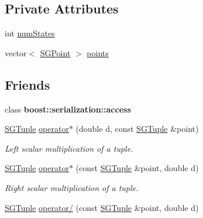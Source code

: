 \subsection*{Private Attributes}
\begin{DoxyCompactItemize}
\item 
int \hyperlink{class_s_g_tuple_a5c3c8e055cba010709ecc8914da1ea4f}{num\+States}
\item 
vector$<$ \hyperlink{class_s_g_point}{S\+G\+Point} $>$ \hyperlink{class_s_g_tuple_a2d9f4a67e7230c46d189eb4472417255}{points}
\end{DoxyCompactItemize}
\subsection*{Friends}
\begin{DoxyCompactItemize}
\item 
\hypertarget{class_s_g_tuple_ac98d07dd8f7b70e16ccb9a01abf56b9c}{class {\bfseries boost\+::serialization\+::access}}\label{class_s_g_tuple_ac98d07dd8f7b70e16ccb9a01abf56b9c}

\item 
\hypertarget{class_s_g_tuple_a774881a3412a621df63ed3454a2923a3}{\hyperlink{class_s_g_tuple}{S\+G\+Tuple} \hyperlink{class_s_g_tuple_a774881a3412a621df63ed3454a2923a3}{operator$\ast$} (double d, const \hyperlink{class_s_g_tuple}{S\+G\+Tuple} \&point)}\label{class_s_g_tuple_a774881a3412a621df63ed3454a2923a3}

\begin{DoxyCompactList}\small\item\em Left scalar multiplication of a tuple. \end{DoxyCompactList}\item 
\hypertarget{class_s_g_tuple_ab4926e79ee6cfcb52928edfee5f7aea6}{\hyperlink{class_s_g_tuple}{S\+G\+Tuple} \hyperlink{class_s_g_tuple_ab4926e79ee6cfcb52928edfee5f7aea6}{operator$\ast$} (const \hyperlink{class_s_g_tuple}{S\+G\+Tuple} \&point, double d)}\label{class_s_g_tuple_ab4926e79ee6cfcb52928edfee5f7aea6}

\begin{DoxyCompactList}\small\item\em Right scalar multiplication of a tuple. \end{DoxyCompactList}\item 
\hypertarget{class_s_g_tuple_a7862330b9a1f30c6d906bdff1fe3af32}{\hyperlink{class_s_g_tuple}{S\+G\+Tuple} \hyperlink{class_s_g_tuple_a7862330b9a1f30c6d906bdff1fe3af32}{operator/} (const \hyperlink{class_s_g_tuple}{S\+G\+Tuple} \&point, double d)}\label{class_s_g_tuple_a7862330b9a1f30c6d906bdff1fe3af32}


\end{DoxyCompactItemize}

